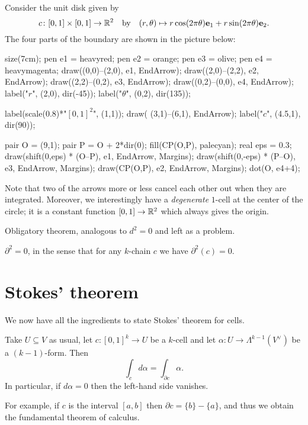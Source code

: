 \begin{example}
	Consider the unit disk given by
	\[ c \colon [0,1] \times [0,1] \to \mathbb R^2 \quad\text{by}\quad
	(r,\theta) \mapsto r\cos(2\pi \theta)\mathbf e_1 + r\sin(2\pi \theta)\mathbf e_2. \]
	The four parts of the boundary are shown in the picture below:
	\begin{center}
		\begin{asy}
			size(7cm);
			pen e1 = heavyred;
			pen e2 = orange;
			pen e3 = olive;
			pen e4 = heavymagenta;
			draw((0,0)--(2,0), e1, EndArrow);
			draw((2,0)--(2,2), e2, EndArrow);
			draw((2,2)--(0,2), e3, EndArrow);
			draw((0,2)--(0,0), e4, EndArrow);
			label("$r$", (2,0), dir(-45));
			label("$\theta$", (0,2), dir(135));

			label(scale(0.8)*"$[0,1]^2$", (1,1));
			draw( (3,1)--(6,1), EndArrow);
			label("$c$", (4.5,1), dir(90));

			pair O = (9,1);
			pair P = O + 2*dir(0);
			fill(CP(O,P), palecyan);
			real eps = 0.3;
			draw(shift(0,eps) * (O--P), e1, EndArrow, Margins);
			draw(shift(0,-eps) * (P--O), e3, EndArrow, Margins);
			draw(CP(O,P), e2, EndArrow, Margins);
			dot(O, e4+4);
		\end{asy}
	\end{center}
	Note that two of the arrows more or less cancel each other out when they are integrated.
	Moreover, we interestingly have a \emph{degenerate} $1$-cell at the center of the circle;
	it is a constant function $[0,1] \to \mathbb R^2$ which always gives the origin.
\end{example}

Obligatory theorem, analogous to $d^2=0$ and left as a problem.
\begin{theorem}
	$\partial^2 = 0$, in the sense that for any $k$-chain $c$ we have $\partial^2(c) = 0$.
\end{theorem}

\section{Stokes' theorem}

We now have all the ingredients to state Stokes' theorem for cells.
\begin{theorem}
	Take $U \subseteq V$ as usual, let $c \colon [0,1]^k \to U$ be a $k$-cell
	and let $\alpha \colon U \to \Lambda^{k-1}(V^\vee)$ be a $(k-1)$-form.
	Then
	\[ \int_c d\alpha = \int_{\partial c} \alpha. \]
	In particular, if $d\alpha = 0$ then the left-hand side vanishes.
\end{theorem}
For example, if $c$ is the interval $[a,b]$ then $\partial c = \{b\} - \{a\}$,
and thus we obtain the fundamental theorem of calculus.

